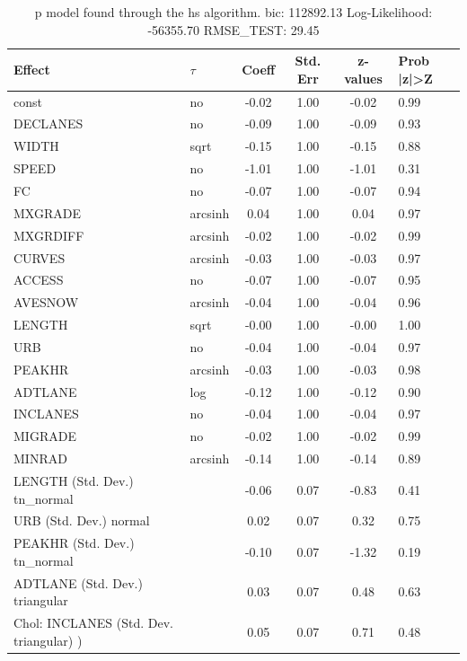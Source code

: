 \begin{table}
	\caption{p model found through the hs algorithm. bic: 112892.13 Log-Likelihood: -56355.70 RMSE_TEST: 29.45}
	\begin{center}
		\begin{tabular}{|l|l|c|c|c|l|}
			\hline
			Effect & $\tau$ & Coeff & Std. Err & z-values & Prob |z|>Z \\
			\hline
			const & no & -0.02 & 1.00 & -0.02 & 0.99 \\
			\hline
			DECLANES & no & -0.09 & 1.00 & -0.09 & 0.93 \\
			\hline
			WIDTH & sqrt & -0.15 & 1.00 & -0.15 & 0.88 \\
			\hline
			SPEED & no & -1.01 & 1.00 & -1.01 & 0.31 \\
			\hline
			FC & no & -0.07 & 1.00 & -0.07 & 0.94 \\
			\hline
			MXGRADE & arcsinh & 0.04 & 1.00 & 0.04 & 0.97 \\
			\hline
			MXGRDIFF & arcsinh & -0.02 & 1.00 & -0.02 & 0.99 \\
			\hline
			CURVES & arcsinh & -0.03 & 1.00 & -0.03 & 0.97 \\
			\hline
			ACCESS & no & -0.07 & 1.00 & -0.07 & 0.95 \\
			\hline
			AVESNOW & arcsinh & -0.04 & 1.00 & -0.04 & 0.96 \\
			\hline
			LENGTH & sqrt & -0.00 & 1.00 & -0.00 & 1.00 \\
			\hline
			URB & no & -0.04 & 1.00 & -0.04 & 0.97 \\
			\hline
			PEAKHR & arcsinh & -0.03 & 1.00 & -0.03 & 0.98 \\
			\hline
			ADTLANE & log & -0.12 & 1.00 & -0.12 & 0.90 \\
			\hline
			INCLANES & no & -0.04 & 1.00 & -0.04 & 0.97 \\
			\hline
			MIGRADE & no & -0.02 & 1.00 & -0.02 & 0.99 \\
			\hline
			MINRAD & arcsinh & -0.14 & 1.00 & -0.14 & 0.89 \\
			\hline
			LENGTH (Std. Dev.) tn_normal &  & -0.06 & 0.07 & -0.83 & 0.41 \\
			\hline
			URB (Std. Dev.) normal &  & 0.02 & 0.07 & 0.32 & 0.75 \\
			\hline
			PEAKHR (Std. Dev.) tn_normal &  & -0.10 & 0.07 & -1.32 & 0.19 \\
			\hline
			ADTLANE (Std. Dev.) triangular &  & 0.03 & 0.07 & 0.48 & 0.63 \\
			\hline
			 Chol: INCLANES (Std. Dev. triangular) ) &  & 0.05 & 0.07 & 0.71 & 0.48 \\

\end{tabular}
\end{center}
\end{table}
